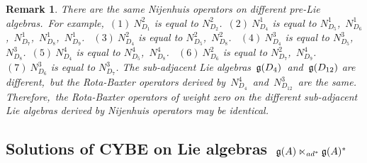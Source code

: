 \documentclass[12pt, reqno]{amsart}
\theoremstyle{plain}
\newtheorem{remark}[theorem]{Remark}
\begin{document}
\begin{remark}
There are the same Nijenhuis operators on different pre-Lie algebras.~For example,~$(1)~N_{D_{1}}^2$ is equal to $N_{D_{2}}^2$.~$(2)~N_{D_{4}}^1$ is equal to $N_{D_{5}}^1$,~$N_{D_{6}}^1$,~$N_{D_{7}}^1$,~$N_{D_{8}}^1$,~$N_{D_{9}}^1$.
~$(3)~N_{D_{4}}^2$ is equal to $N_{D_{5}}^2$,~$N_{D_{8}}^2$.
~$(4)~N_{D_{4}}^3$ is equal to $N_{D_{5}}^3$,~$N_{D_{8}}^3$.~$(5)~N_{D_{4}}^4$ is equal to $N_{D_{5}}^4$,~$N_{D_{8}}^4$.
~$(6)~N_{D_{6}}^2$ is equal to $N_{D_{7}}^2$,~$N_{D_{9}}^4$.
~$(7)~N_{D_{6}}^3$ is equal to $N_{D_{7}}^3$.
The sub-adjacent Lie algebras~${\frak g}(D_{4})$~and~${\frak g}(D_{12})$ are different,~but the Rota-Baxter operators derived by~$N_{D_{4}}^4$~and~$N_{D_{12}}^3$~are the same.
Therefore,~the Rota-Baxter operators of weight zero on the different sub-adjacent Lie algebras derived by Nijenhuis operators may be identical.

\end{remark}

\subsection{Solutions of CYBE on Lie algebras~${\frak g}(A) \ltimes_{{\rm ad}^{\ast}} {\frak g}(A)^{\ast}$}
\end{document}
